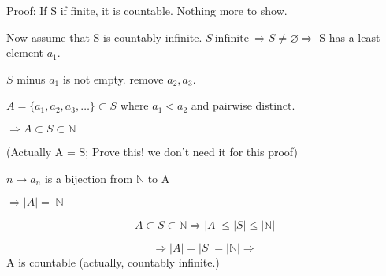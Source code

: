 \documentclass{article}
\begin{document}
 Proof: If S if finite, it is countable. Nothing more to show.

 Now assume that S is countably infinite. $S \ \text{infinite} \ \Rightarrow S \neq \varnothing \Rightarrow$ S has a least element $a_1$.

 $S$ minus $a_1$ is not empty. remove $a_2, a_3$.

 $A = \{a_1, a_2, a_3, \dots\} \subset S$ where $a_1 < a_2$ and pairwise distinct.

 $\Rightarrow A \subset S \subset \mathbb{N}$

 (Actually A = S; Prove this! we don't need it for this proof)

 $n \to a_n$ is a bijection from $\mathbb{N}$ to A

 $\Rightarrow |A| = |\mathbb{N}|$

 $$A \subset S \subset \mathbb{N} \Rightarrow |A| \leq |S| \leq |\mathbb{N}|$$

 $$ \Rightarrow |A| = |S| = |\mathbb{N}| \Rightarrow $$ A is countable (actually, countably infinite.)

 
 
\end{document}
